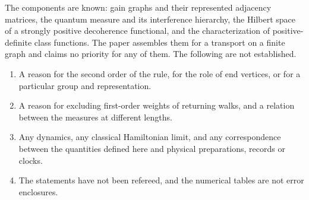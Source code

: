 The components are known: gain graphs and their represented adjacency matrices, the quantum measure and its interference hierarchy, the Hilbert space of a strongly positive decoherence functional, and the characterization of positive-definite class functions. The paper assembles them for a transport on a finite graph and claims no priority for any of them. The following are not established.
\begin{enumerate}[label=(\roman*)]
\item A reason for the second order of the rule, for the role of end vertices, or for a particular group and representation.
\item A reason for excluding first-order weights of returning walks, and a relation between the measures at different lengths.
\item Any dynamics, any classical Hamiltonian limit, and any correspondence between the quantities defined here and physical preparations, records or clocks.
\item The statements have not been refereed, and the numerical tables are not error enclosures.
\end{enumerate}
